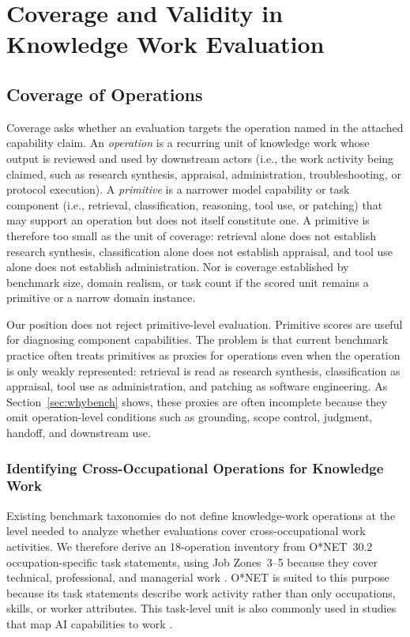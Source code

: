 \documentclass{article}
\begin{document}
\section{Coverage and Validity in Knowledge Work Evaluation}
\label{sec:framework}

\subsection{Coverage of Operations}
\label{sec:coverage-axis}
\label{sec:realwork}
Coverage asks whether an evaluation targets the operation named in the attached capability claim.
An \emph{operation} is a recurring unit of knowledge work whose output is reviewed and used by downstream actors (i.e., the work activity being claimed, such as research synthesis, appraisal, administration, troubleshooting, or protocol execution).
A \emph{primitive} is a narrower model capability or task component (i.e., retrieval, classification, reasoning, tool use, or patching) that may support an operation but does not itself constitute one.
A primitive is therefore too small as the unit of coverage: retrieval alone does not establish research synthesis, classification alone does not establish appraisal, and tool use alone does not establish administration.
Nor is coverage established by benchmark size, domain realism, or task count if the scored unit remains a primitive or a narrow domain instance.

Our position does not reject primitive-level evaluation.
Primitive scores are useful for diagnosing component capabilities.
The problem is that current benchmark practice often treats primitives as proxies for operations even when the operation is only weakly represented: retrieval is read as research synthesis, classification as appraisal, tool use as administration, and patching as software engineering.
As Section~\ref{sec:whybench} shows, these proxies are often incomplete because they omit operation-level conditions such as grounding, scope control, judgment, handoff, and downstream use.

\subsubsection{Identifying Cross-Occupational Operations for Knowledge Work}
\label{sec:coverage-inventory}

Existing benchmark taxonomies do not define knowledge-work operations at the level needed to analyze whether evaluations cover cross-occupational work activities.
We therefore derive an 18-operation inventory from O{*}NET~30.2 occupation-specific task statements, using Job Zones~3--5 because they cover technical, professional, and managerial work \citep{onet2024tasks}.
O{*}NET is suited to this purpose because its task statements describe work activity rather than only occupations, skills, or worker attributes.
This task-level unit is also commonly used in studies that map AI capabilities to work \citep{eloundou2023gpts,felten2021occupational,webb2020aitasks}.
\end{document}

